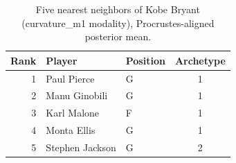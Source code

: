 \begin{table}[htbp]
  \centering\small
  \begin{tabular}{rllc}
    \toprule
    Rank & Player & Position & Archetype \\
    \midrule
    1 & Paul Pierce & G & 1 \\
    2 & Manu Ginobili & G & 1 \\
    3 & Karl Malone & F & 1 \\
    4 & Monta Ellis & G & 1 \\
    5 & Stephen Jackson & G & 2 \\
    \bottomrule
  \end{tabular}
  \caption{Five nearest neighbors of Kobe Bryant (curvature_m1 modality), Procrustes-aligned posterior mean.}
  \label{tab:Kobe_Bryant_neighbors_curvature_m1}
\end{table}

